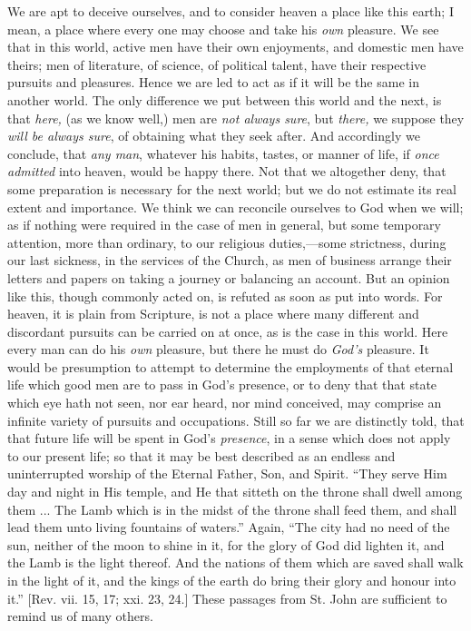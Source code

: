We are apt to deceive ourselves, and to consider
heaven a place like this earth; I mean, a place where
every one may choose and take his \emph{own} pleasure.
We see that in this world, active men have their own
enjoyments, and domestic men have theirs; men of
literature, of science, of political talent, have their
respective pursuits and pleasures. Hence we are led to
act as if it will be the same in another world. The only
difference we put between this world and the next, is
that \emph{here\emph{,}} (as we know well,) men are \emph{not
always sure}, but \emph{there\emph{,}} we suppose they \emph{will
be always sure}, of obtaining what they seek after.
And accordingly we conclude, that \emph{any man},
whatever his habits, tastes, or manner of life, if \emph{once
admitted} into heaven, would be happy there. Not that
we altogether deny, that some preparation is necessary
for the next world; but we do not estimate its real
extent and importance. We think we can reconcile
ourselves to God when we will; as if nothing were
required in the case of men in general, but some
temporary attention, more than ordinary, to our religious
duties,—some strictness, during our last sickness, in the services of the Church, as men of business arrange
their letters and papers on taking a journey or balancing
an account. But an opinion like this, though commonly
acted on, is refuted as soon as put into words. For
heaven, it is plain from Scripture, is not a place where
many different and discordant pursuits can be carried on
at once, as is the case in this world. Here every man can
do his \emph{own} pleasure, but there he must do \emph{God's}
pleasure. It would be presumption to attempt to determine
the employments of that eternal life which good men are
to pass in God's presence, or to deny that that
state which eye hath not seen, nor ear heard, nor mind
conceived, may comprise an infinite variety of pursuits
and occupations. Still so far we are distinctly told,
that that future life will be spent in God's \emph{presence}, in
a sense which does not apply to our present life; so that
it may be best described as an endless and uninterrupted
worship of the Eternal Father, Son, and Spirit.
``They serve Him day and night in His temple, and He
that sitteth on the throne shall dwell among them ... The
Lamb which is in the midst of the throne shall feed them,
and shall lead them unto living fountains of
waters.'' Again, ``The city had no need of the
sun, neither of the moon to shine in it, for the glory of
God did lighten it, and the Lamb is the light thereof.
And the nations of them which are saved shall walk in the
light of it, and the kings of the earth do bring their
glory and honour into it.'' [Rev. vii. 15, 17; xxi.
23, 24.] These passages from St. John are sufficient to
remind us of many others.


